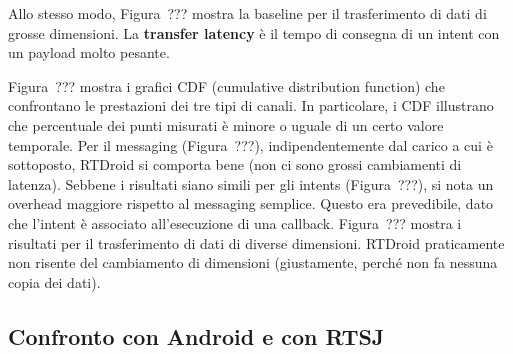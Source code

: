 Allo stesso modo, Figura~??? mostra la baseline per il trasferimento di dati di grosse dimensioni. La \textbf{transfer latency} è il tempo di consegna di un intent con un payload molto pesante.

Figura~??? mostra i grafici CDF (cumulative distribution function) che confrontano le prestazioni dei tre tipi di canali. In particolare, i CDF illustrano che percentuale dei punti misurati è minore o uguale di un certo valore temporale. Per il messaging (Figura~???), indipendentemente dal carico a cui è sottoposto, RTDroid si comporta bene (non ci sono grossi cambiamenti di latenza). Sebbene i risultati siano simili per gli intents (Figura~???), si nota un overhead maggiore rispetto al messaging semplice. Questo era prevedibile, dato che l'intent è associato all'esecuzione di una callback. Figura~??? mostra i risultati per il trasferimento di dati di diverse dimensioni. RTDroid praticamente non risente del cambiamento di dimensioni (giustamente, perché non fa nessuna copia dei dati).

\subsection{Confronto con Android e con RTSJ}


